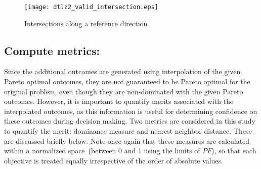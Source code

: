 \begin{figure}[!ht]
	\centering
	\texttt{[image: dtlz2\_valid\_intersection.eps]}
	\caption{Intersections along a reference direction}
	\label{fig:dtlz2_intersection}
\end{figure}

\subsection{Compute metrics:} Since the additional outcomes are generated using interpolation of the given Pareto optimal outcomes, they are not guaranteed to be Pareto optimal for the original problem, even though they are non-dominated with the given Pareto outcomes. However, it is important to quantify merits associated with the interpolated outcomes, as this information is useful for determining confidence on these outcomes during decision making. Two metrics are considered in this study to quantify the merit: dominance measure and nearest neighbor distance. 
These are discussed briefly below. {\color{blue}Note once again that these measures are calculated within a normalized space~(between 0 and 1 using the limits of $PF$), so that each objective is treated equally irrespective of the order of absolute values.} 
